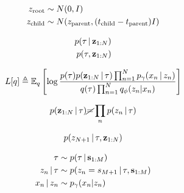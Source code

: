 \begin{align*}
    z_{\textrm{root}} &\sim N(0, I) \\
    z_{\textrm{child}} &\sim N(z_{\textrm{parent}}, (t_{\textrm{child}} - t_{\textrm{parent}}) I)
\end{align*}

\begin{align*}
    p(\tau \,|\, \mathbf{z}_{1:N}) \\
    p(\tau, \mathbf{z}_{1:N})
\end{align*}

\begin{align*}
  L[q] \triangleq \mathbb{E}_q\left[\log \frac{p(\tau)p(\mathbf{z}_{1:N} \,|\, \tau)\prod_{n = 1}^N p_\gamma(x_n \,|\, z_n)}
  {q(\tau)\prod_{n = 1}^N q_\phi(z_n | x_n)}\right]
\end{align*}

\begin{align*}
  p(\mathbf{z}_{1:N} \,|\, \tau) \cancel{=} \prod_n p(z_n \,|\, \tau)
\end{align*}

\begin{align*}
    p(z_{N + 1} \,|\, \tau, \mathbf{z}_{1:N})
\end{align*}

\begin{align*}
  \tau &\sim p(\tau \,|\, \textbf{s}_{1:M}) \\
  z_n \,|\, \tau &\sim p(z_n = s_{M + 1} \,|\, \tau, \textbf{s}_{1:M}) \\
  x_n \,|\, z_n &\sim p_\gamma(x_n | z_n)
\end{align*}
\fi
